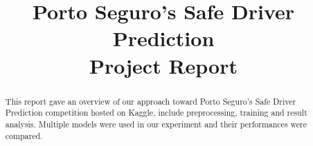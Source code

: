 \documentclass[conference]{IEEEtran}
\begin{document}
\title{Porto Seguro's Safe Driver Prediction\\Project Report}
\author{
}

\maketitle

\begin{abstract}
This report gave an overview of our approach toward Porto Seguro's Safe Driver
Prediction competition hosted on Kaggle, include preprocessing, training and
result analysis. Multiple models were used in our experiment and their
performances were compared.

\end{abstract}
















{}


\end{document}
